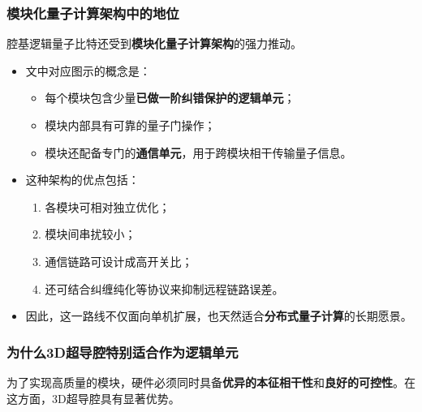 \documentclass[12pt,a4paper,oneside]{ctexbook}
\begin{document}
\subsubsection{模块化量子计算架构中的地位}

腔基逻辑量子比特还受到\textbf{模块化量子计算架构}的强力推动。

\begin{itemize}
    \item 文中对应图示的概念是：
    \begin{itemize}
        \item 每个模块包含少量\textbf{已做一阶纠错保护的逻辑单元}；
        \item 模块内部具有可靠的量子门操作；
        \item 模块还配备专门的\textbf{通信单元}，用于跨模块相干传输量子信息。
    \end{itemize}
    
    \item 这种架构的优点包括：
    \begin{enumerate}
        \item 各模块可相对独立优化；
        \item 模块间串扰较小；
        \item 通信链路可设计成高开关比；
        \item 还可结合纠缠纯化等协议来抑制远程链路误差。
    \end{enumerate}
    
    \item 因此，这一路线不仅面向单机扩展，也天然适合\textbf{分布式量子计算}的长期愿景。
\end{itemize}

\subsubsection{为什么3D超导腔特别适合作为逻辑单元}

为了实现高质量的模块，硬件必须同时具备\textbf{优异的本征相干性}和\textbf{良好的可控性}。在这方面，3D超导腔具有显著优势。
\end{document}
